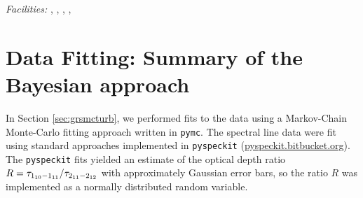 % 
% 
% 
% 

{\it Facilities:} , , ,
, 



\section{Data Fitting: Summary of the Bayesian approach}
In Section \ref{sec:grsmcturb}, we performed fits to the data using a
Markov-Chain Monte-Carlo fitting approach written in \texttt{pymc}.  The spectral line
data were fit using standard approaches implemented in \texttt{pyspeckit}
(\url{pyspeckit.bitbucket.org}).  The \texttt{pyspeckit} fits yielded an
estimate of the optical depth ratio $R = \tau_{1_{10}-1_{11}}/\tau_{2_{11}-2_{12}}$ with approximately
Gaussian error bars, so the ratio $R$ was implemented as a normally distributed
random variable.


